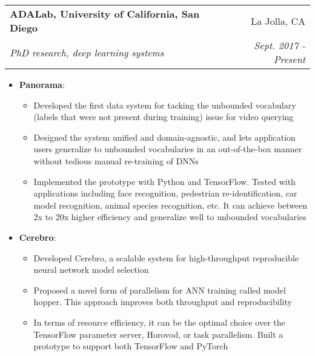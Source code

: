 \documentclass[letterpaper,11pt]{article}
\makeatletter
\newcommand{\resumeItem}[2]{
  \item\small{
    \textbf{#1}{: #2 \vspace{-2pt}}
  }
}
\newcommand{\resumeSubheading}[4]{
  \vspace{-1pt}\item
    \begin{tabular*}{0.97\textwidth}[t]{l@{\extracolsep{\fill}}r}
      \textbf{#1} & #2 \\
      \textit{\small#3} & \textit{\small #4}
    \end{tabular*}\vspace{-5pt}
}
\newcommand{\resumeItemListStart}{\begin{itemize}}
\newcommand{\resumeItemListEnd}{\end{itemize}\vspace{-5pt}}
\makeatother
\begin{document}
    \resumeSubheading
      {ADALab, University of California, San Diego}{La Jolla, CA}
      {PhD research, deep learning systems}{Sept. 2017 - Present}
     
      \resumeItemListStart
        \resumeItem{Panorama}
          {}
          {\small
           \begin{itemize}
                 \item Developed the first data system for tacking the unbounded vocabulary (labels that were not present during training) issue for video querying \vspace{-2pt}
              	 \item Designed the system unified and domain-agnostic, and lets application users generalize to unbounded vocabularies in an out-of-the-box manner without tedious manual re-training of DNNs \vspace{-2pt}
	          \item Implemented the prototype with Python and TensorFlow. Tested with applications including face recognition, pedestrian re-identification, car model recognition, animal species recognition, etc. It can achieve between 2x to 20x higher efficiency and generalize well to unbounded vocabularies \vspace{-2pt}
            \end{itemize}\vspace{-5pt}
          }
          \resumeItem{Cerebro}
          {}
          {\small 
          \begin{itemize}
                 \item Developed Cerebro, a scalable system for high-throughput reproducible neural network model selection \vspace{-2pt}
              	 \item Proposed a novel form of parallelism for ANN training called model hopper. This approach improves both throughput and reproducibility \vspace{-2pt}
	          \item In terms of resource efficiency, it can be the optimal choice over the TensorFlow parameter server, Horovod, or task parallelism. Built a prototype to support both TensorFlow and PyTorch \vspace{-2pt}
            \end{itemize}\vspace{-5pt}
            }
      \resumeItemListEnd
\end{document}
